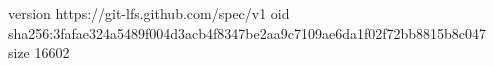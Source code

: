 version https://git-lfs.github.com/spec/v1
oid sha256:3fafae324a5489f004d3acb4f8347be2aa9c7109ae6da1f02f72bb8815b8c047
size 16602
